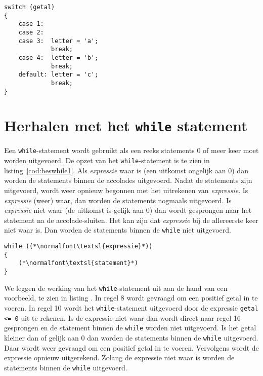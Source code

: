 \begin{lstlisting}[caption=Opzet van het \texttt{switch}-statment.,label=cod:switch2]
switch (getal)
{
    case 1:
    case 2:
    case 3:  letter = 'a';
             break;
    case 4:  letter = 'b';
             break;
    default: letter = 'c';
             break;
}
\end{lstlisting}


\section{Herhalen met het \texttt{while} statement}
Een \texttt{while}-statement wordt gebruikt als een reeks statements 0 of meer keer moet worden uitgevoerd. De opzet van het \texttt{while}-statement is te zien in listing~\ref{cod:beswhile1}. Als \textsl{expressie} waar is (een uitkomst ongelijk aan 0) dan worden de statements binnen de accolades uitgevoerd. Nadat de statements zijn uitgevoerd, wordt weer opnieuw begonnen met het uitrekenen van \textsl{expressie}. Is \textsl{expressie} (weer) waar, dan worden de statements nogmaals uitgevoerd. Is \textsl{expressie} niet waar (de uitkomst is gelijk aan 0) dan wordt gesprongen naar het statement na de accolade-sluiten. Het kan zijn dat \textsl{expressie} bij de allereerste keer niet waar is. Dan worden de statements binnen de \texttt{while} niet uitgevoerd.

\begin{lstlisting}[caption=Opzet \texttt{while}-statement.,label=cod:beswhile1]
while ((*\normalfont\textsl{expressie}*))
{
    (*\normalfont\textsl{statement}*)
}
\end{lstlisting}

We leggen de werking van het \texttt{while}-statement uit aan de hand van een voorbeeld, te zien in listing . In regel 8 wordt gevraagd om een positief getal in te voeren. In regel 10 wordt het \texttt{while}-statement uitgevoerd door de expressie \texttt{getal <= 0} uit te rekenen. Is de expressie niet waar dan wordt direct naar regel 16 gesprongen en de statement binnen de \texttt{while} worden niet uitgevoerd. Is het getal kleiner dan of gelijk aan 0 dan worden de statements binnen de \texttt{while} uitgevoerd. Daar wordt weer gevraagd om een positief getal in te voeren. Vervolgens wordt de expressie opnieuw uitgerekend. Zolang de expressie niet waar is worden de statements binnen de \texttt{while} uitgevoerd.






